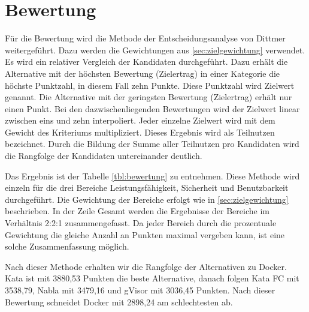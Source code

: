 \section{Bewertung}
\label{sec:bewertung}
Für die Bewertung wird die Methode der Entscheidungsanalyse von Dittmer weitergeführt. Dazu werden die Gewichtungen aus \ref{sec:zielgewichtung} verwendet. Es wird ein relativer Vergleich der Kandidaten durchgeführt. Dazu erhält die Alternative mit der höchsten Bewertung (Zielertrag) in einer Kategorie die höchste Punktzahl, in diesem Fall zehn Punkte. Diese Punktzahl wird Zielwert genannt. Die Alternative mit der geringsten Bewertung (Zielertrag) erhält nur einen Punkt. Bei den dazwischenliegenden Bewertungen wird der Zielwert linear zwischen eins und zehn interpoliert. Jeder einzelne Zielwert wird mit dem Gewicht des Kriteriums multipliziert. Dieses Ergebnis wird als Teilnutzen bezeichnet. Durch die Bildung der Summe aller Teilnutzen pro Kandidaten wird die Rangfolge der Kandidaten untereinander deutlich.  \cite[vgl.][S. 151 ff.]{Dittmer.2002}

Das Ergebnis ist der Tabelle \ref{tbl:bewertung} zu entnehmen. Diese Methode wird einzeln für die drei Bereiche Leistungsfähigkeit, Sicherheit und Benutzbarkeit durchgeführt. Die Gewichtung der Bereiche erfolgt wie in \ref{sec:zielgewichtung} beschrieben. In der Zeile Gesamt werden die Ergebnisse der Bereiche im Verhältnis 2:2:1 zusammengefasst. Da jeder Bereich durch die prozentuale Gewichtung die gleiche Anzahl an Punkten maximal vergeben kann, ist eine solche Zusammenfassung möglich.

Nach dieser Methode erhalten wir die Rangfolge der Alternativen zu Docker. Kata ist mit 3880,53 Punkten die beste Alternative, danach folgen Kata FC mit 3538,79, Nabla mit 3479,16 und gVisor mit 3036,45 Punkten. Nach dieser Bewertung schneidet Docker mit 2898,24 am schlechtesten ab.

